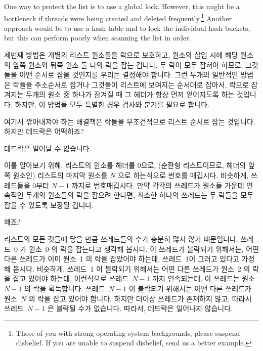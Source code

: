 One way to protect the list is to use a global lock.
However, this might be a bottleneck if threads were being created and
deleted frequently.\footnote{
	Those of you with strong operating-system backgrounds, please
	suspend disbelief.
	If you are unable to suspend disbelief, send us a better example.}
Another approach would be to use a hash table and to lock the individual
hash buckets, but this can perform poorly when scanning the list in order.
\fi

세번째 방법은 개별의 리스트 원소들을 락으로 보호하고, 원소의 삽입 시에 해당
원소의 앞쪽 원소와 뒤쪽 원소 둘 다의 락을 잡는 겁니다.
두 락이 모두 잡혀야 하므로, 그것들을 어떤 순서로 잡을 것인지를 우리는 결정해야
합니다.
그런 두개의 일반적인 방법은 락들을 주소순서로 잡거나 그것들이 리스트에 보여지는
순서대로 잡아서, 락으로 잠겨지는 두개의 원소 중 하나가 잠겨질 때 그 헤더가 항상
먼저 얻어지도록 하는 것입니다.
하지만, 이 방법들 모두 특별한 경우 검사와 분기를 필요로 합니다.

여기서 깎아내져야 하는 해결책은 락들을 무조건적으로 리스트 순서로 잡는
것입니다.
하지만 데드락은 어떡하죠?

데드락은 일어날 수 없습니다.

이를 알아보기 위해, 리스트의 원소를 헤더를 0으로, (순환형 리스트이므로, 헤더의
앞쪽 원소인) 리스트의 마지막 원소를 $N$ 으로 하는식으로 번호를 매깁시다.
비슷하게, 쓰레드들을 0부터 $N-1$ 까지로 번호매깁시다.
만약 각각의 쓰레드가 원소들 가운데 연속적인 두개의 원소들의 락을 잡으려 한다면,
최소한 하나의 쓰레드는 두 락들을 모두 잡을 수 있도록 보장될 겁니다.

왜죠?

리스트의 모든 것들에 닿을 만큼 쓰레드들의 수가 충분히 많지 않기 때문입니다.
쓰레드~0 가 원소~0 의 락을 잡는다고 생각해 봅시다.
이 쓰레드가 블락되기 위해서는, 어떤 다른 쓰레드가 이미 원소~1 의 락을 잡았어야
하는데, 쓰레드~1이 그러고 있다고 가정해 봅시다.
비슷하게, 쓰레드~1 이 블락되기 위해서는 어떤 다른 쓰레드가 원소~2 의 락을 잡고
있어야 하는데, 이런식으로 쓰레드~$N-1$ 까지 연속되는데, 이 쓰레드는 원소~$N-1$
의 락을 획득합니다.
쓰레드~$N-1$ 이 블락되기 위해서는 어떤 다른 쓰레드가 원소~$N$ 의 락을 잡고
있어야 합니다.
하지만 더이상 쓰레드가 존재하지 않고, 따라서 쓰레드~$N-1$ 은 블락될 수가
없습니다.
따라서, 데드락은 일어나지 않습니다.
\iffalse

